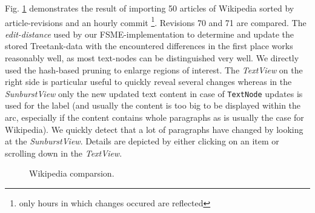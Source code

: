 Fig. \ref{fig:wikivis} demonstrates the result of importing 50 articles of Wikipedia sorted by article-revisions and an hourly commit \footnote{only hours in which changes occured are reflected}. Revisions 70 and 71 are compared. The \emph{edit-distance} used by our FSME-implementation to determine and update the stored Treetank-data with the encountered differences in the first place works reasonably well, as most text-nodes can be distinguished very well. We directly used the hash-based pruning to enlarge regions of interest. The \emph{TextView} on the right side is particular useful to quickly reveal several changes whereas in the \emph{SunburstView} only the new updated text content in case of \texttt{TextNode} updates is used for the label (and usually the content is too big to be displayed within the arc, especially if the content contains whole paragraphs as is usually the case for Wikipedia). We quickly detect that a lot of paragraphs have changed by looking at the \emph{SunburstView}. Details are depicted by either clicking on an item or scrolling down in the \emph{TextView}. %

\begin{figure}[tb]
\caption{\label{fig:wikivis} Wikipedia comparsion.}
\end{figure}

